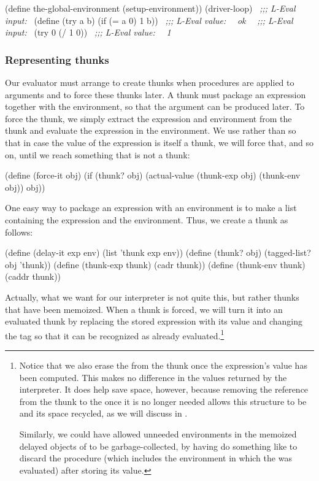 \begin{codeBlock}
(define the-global-environment (setup-environment))
(driver-loop)
~\textit{;;; L-Eval input:}~
(define (try a b) (if (= a 0) 1 b))
~\textit{;;; L-Eval value:}~
~\textit{ok}~
~\textit{;;; L-Eval input:}~
(try 0 (/ 1 0))
~\textit{;;; L-Eval value:}~
~\textit{1}~
\end{codeBlock}

\subsubsection*{Representing thunks}

Our evaluator must arrange to create thunks when procedures are applied to
arguments and to force these thunks later.  A thunk must package an expression
together with the environment, so that the argument can be produced later.  To
force the thunk, we simply extract the expression and environment from the
thunk and evaluate the expression in the environment.  We use
 rather than  so that in case the value of the
expression is itself a thunk, we will force that, and so on, until we reach
something that is not a thunk:

\begin{codeBlock}
(define (force-it obj)
  (if (thunk? obj)
      (actual-value (thunk-exp obj) (thunk-env obj))
      obj))
\end{codeBlock}

\noindent
One easy way to package an expression with an environment is to make a list
containing the expression and the environment.  Thus, we create a thunk as
follows:

\begin{codeBlock}
(define (delay-it exp env)
  (list 'thunk exp env))
(define (thunk? obj)
  (tagged-list? obj 'thunk))
(define (thunk-exp thunk) (cadr  thunk))
(define (thunk-env thunk) (caddr thunk))
\end{codeBlock}

\noindent
Actually, what we want for our interpreter is not quite this, but rather thunks
that have been memoized.  When a thunk is forced, we will turn it into an
evaluated thunk by replacing the stored expression with its value and changing
the  tag so that it can be recognized as already
evaluated.\footnote{Notice that we also erase the  from the thunk
once the expression's value has been computed.  This makes no difference in the
values returned by the interpreter.  It does help save space, however, because
removing the reference from the thunk to the  once it is no longer
needed allows this structure to be  and its space
recycled, as we will discuss in .

Similarly, we could have allowed unneeded environments in the memoized delayed
objects of  to be garbage-collected, by having
 do something like  to discard the
procedure  (which includes the environment in which the 
was evaluated) after storing its value.}

